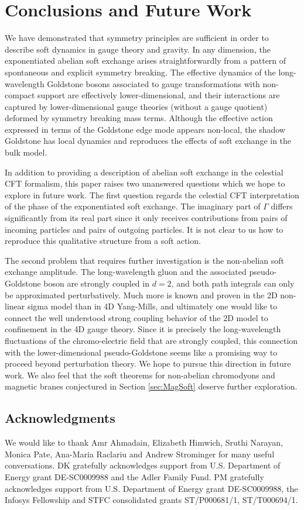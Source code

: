 \documentclass[11pt]{article}
\def\G{{\Gamma}}
\begin{document}
\section{Conclusions and Future Work}\label{sec:Conclusion}
We have demonstrated that symmetry principles are sufficient in order to describe soft dynamics in gauge theory and gravity. In any dimension, the exponentiated abelian soft exchange arises straightforwardly from a pattern of spontaneous and explicit symmetry breaking. The effective dynamics of the long-wavelength Goldstone bosons associated to gauge transformations with non-compact support are effectively lower-dimensional, and their interactions are captured by lower-dimensional gauge theories (without a gauge quotient) deformed by symmetry breaking mass terms.  Although the effective action expressed in terms of the Goldstone edge mode appears non-local, the shadow Goldstone has local dynamics and reproduces the effects of soft exchange in the bulk model.

In addition to providing a description of abelian soft exchange in the celestial CFT formalism, this paper raises two unanswered questions which we hope to explore in future work. The first question regards the celestial CFT interpretation of the phase of the exponentiated soft exchange. The imaginary part of $\G$ differs significantly from its real part since it only receives contributions from pairs of incoming particles and pairs of outgoing particles. It is not clear to us how to reproduce this qualitative structure from a soft action.

The second problem that requires further investigation is the non-abelian soft exchange amplitude. The long-wavelength gluon and the associated pseudo-Goldstone boson are strongly coupled in $d=2$, and both path integrals can only be approximated perturbatively. Much more is known and proven in the 2D non-linear sigma model than in 4D Yang-Mills, and ultimately one would like to connect the well understood strong coupling behavior of the 2D model to confinement in the 4D gauge theory. Since it is precisely the long-wavelength fluctuations of the chromo-electric field that are strongly coupled, this connection with the lower-dimensional pseudo-Goldstone seems like a promising way to proceed beyond perturbation theory. We hope to pursue this direction in future work. We also feel that the soft theorems for non-abelian chromodyons and magnetic branes conjectured in Section \ref{sec:MagSoft} deserve further exploration. 


\subsection*{Acknowledgments}
We would like to thank Amr Ahmadain, Elizabeth Himwich, Sruthi Narayan, Monica Pate, Ana-Maria Raclariu and Andrew Strominger for many useful conversations. DK gratefully acknowledges support from U.S. Department of Energy grant DE-SC0009988 and the Adler Family Fund. PM gratefully acknowledges support from U.S. Department of Energy grant DE-SC0009988, the Infosys Fellowship and STFC consolidated grants ST/P000681/1, ST/T000694/1.
\end{document}
